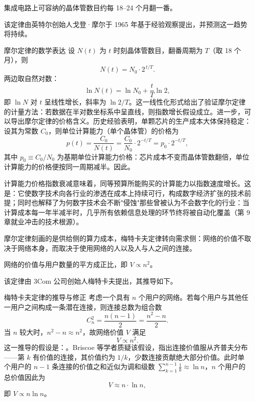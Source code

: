 \begin{definition}
集成电路上可容纳的晶体管数目约每 18--24 个月翻一番。
\end{definition}

该定律由英特尔创始人戈登·摩尔于 1965 年基于经验观察提出，并预测这一趋势将持续。

\begin{derivation}{摩尔定律的数学表达}{}
设 $N(t)$ 为 $t$ 时刻晶体管数目，翻番周期为 $T$（取 18 个月），则
\[
N(t) = N_0 \cdot 2^{\,t/T}.
\]
两边取自然对数：
\[
\ln N(t) = \ln N_0 + \frac{t}{T}\ln 2,
\]
即 $\ln N$ 对 $t$ 呈线性增长，斜率为 $\ln 2 / T$。这一线性化形式给出了验证摩尔定律的计量方法：若数据在半对数坐标系中呈直线，则指数增长假设成立。进一步，可以导出摩尔定律的价格含义。历史经验表明，单颗芯片的生产成本大体保持稳定：设其为常数 $C_0$，则单位计算能力（单个晶体管）的价格为
\[
p(t) = \frac{C_0}{N(t)} = \frac{C_0}{N_0} \cdot 2^{-t/T} = p_0 \cdot 2^{-t/T},
\]
其中 $p_0 \equiv C_0 / N_0$ 为基期单位计算能力价格：芯片成本不变而晶体管数翻倍，单位计算能力的价格便按同一周期减半。因此。
\end{derivation}

计算能力价格指数衰减意味着，同等预算所能购买的计算能力以指数速度增长。这是：它使数字技术向各行业的渗透在成本上持续可行，构成数字经济扩张的技术前提；同时也解释了为何数字技术会不断"侵蚀"那些曾被认为不会数字化的行业：当计算成本每一年半减半时，几乎所有依赖信息处理的环节终将被自动化覆盖（第 9 章就业冲击的技术根源）。

摩尔定律刻画的是供给侧的算力成本，梅特卡夫定律转向需求侧：网络的价值不取决于网络本身，而取决于使用网络的人以及人与人之间的连接。

\begin{definition}
网络的价值与用户数量的平方成正比，即 $V \propto n^2$。
\end{definition}

该定律由 3Com 公司创始人梅特卡夫提出，其推导如下。

\begin{derivation}{梅特卡夫定律的推导与修正}{}
考虑一个具有 $n$ 个用户的网络。若每个用户与其他任一用户之间构成一条潜在连接，则连接总数为组合数
\[
C_n^2 = \frac{n(n-1)}{2} = \frac{n^2 - n}{2}.
\]
当 $n$ 较大时，$n^2 - n \approx n^2$，故网络价值 $V$ 满足
\[
V \propto n^2.
\]
这一推导的假设是：。Briscoe 等学者质疑该假设，指出连接价值服从齐普夫分布——第 $k$ 有价值的连接，其价值约为 $1/k$，少数连接贡献绝大部分价值。此时单个用户的 $n-1$ 条连接的价值之和近似为调和级数 $\sum_{k=1}^{n-1} \frac{1}{k} \approx \ln n$，$n$ 个用户的总价值因此为
\[
V \approx n \cdot \ln n,
\]
即 $V \propto n \ln n$。
\end{derivation}

